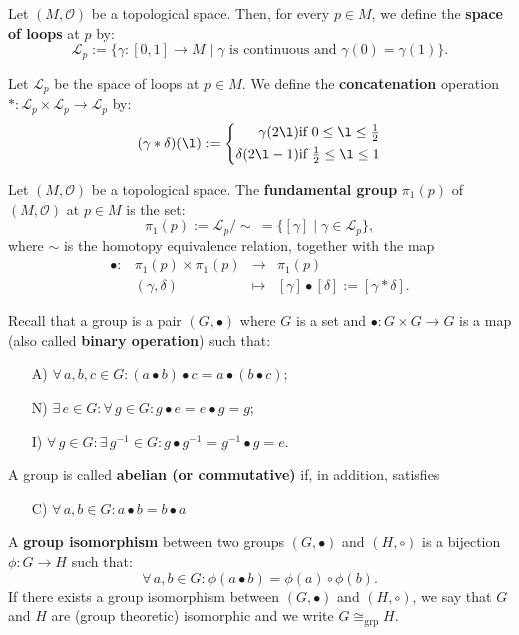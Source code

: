 \documentclass[root.tex]{subfiles}
\begin{document}
\begin{mydef}
Let $(M,\mathcal{O})$ be a topological space. Then, for every $p\in M$, we define the \textbf{space of loops} at $p$ by:
$$
\mathcal{L}_p := \{\gamma:[0,1]\to M \mid \gamma \text{ is continuous and } \gamma(0)=\gamma(1)\}.
$$
\end{mydef}

\begin{mydef}
Let $\mathcal{L}_p$ be the space of loops at $p\in M$. We define the \textbf{concatenation} operation $*: \mathcal{L}_p\times\mathcal{L}_p\to\mathcal{L}_p$ by:
$$
(\gamma * \delta) (\l):= \left\{ 
  \begin{aligned}
    \gamma(2\l) & \text{if } 0\leq \l \leq \tfrac{1}{2}\\ 
\delta(2\l-1) & \text{if } \tfrac{1}{2}\leq \l \leq 1 
\end{aligned} 
\right.
$$
\end{mydef}

\begin{mydef}
Let $(M,\mathcal{O})$ be a topological space. The \textbf{fundamental group} $\pi_1(p)$ of $(M,\mathcal{O})$ at $p\in M$ is the set:
$$
\pi_1(p) := \mathcal{L}_p/\!\sim\ = \{[\gamma] \mid \gamma \in \mathcal{L}_p\},
$$
where $\sim$ is the homotopy equivalence relation, together with the map 
$$ \begin{aligned}
\bullet : & \pi_1(p)\times \pi_1(p) &\to &\pi_1(p)\\
&(\gamma,\delta)&\mapsto & [\gamma]\bullet[\delta]:=[\gamma*\delta] .
\end{aligned} $$
\end{mydef}

\begin{remark}
Recall that a group is a pair $(G,\bullet)$ where $G$ is a set and $\bullet : G\times G \to G$ is a map (also called \textbf{binary operation}) such that:
\begin{enumerate}
\item[A)] $\forall \, a,b,c \in G : (a\bullet b)\bullet c = a \bullet (b\bullet c)$;
\item[N)] $\exists \, e \in G : \forall \, g \in G : g \bullet e = e \bullet g = g$;
\item[I)] $\forall \, g \in G : \exists \, g^{-1}\in G: g \bullet g^{-1} = g^{-1} \bullet g = e$.
\end{enumerate}
A group is called \textbf{abelian (or commutative)} if, in addition, satisfies 
\begin{enumerate}
\item[C)] $\forall \, a,b \in G : a\bullet b = b \bullet a$
\end{enumerate}

A \textbf{group isomorphism} between two groups $(G,\bullet)$ and $(H,\circ)$ is a bijection $\phi: G \to H$ such that:
$$
\forall \, a,b \in G:\phi(a \bullet b) = \phi(a)\circ\phi(b).
$$
If there exists a group isomorphism between $(G,\bullet)$ and $(H,\circ)$, we say that $G$ and $H$ are (group theoretic) isomorphic and we write $G \cong_\mathrm{grp} H$.
\end{remark}
\end{document}
